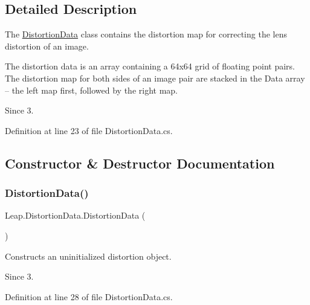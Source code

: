 \subsection{Detailed Description}
The \mbox{\hyperlink{class_leap_1_1_distortion_data}{Distortion\+Data}} class contains the distortion map for correcting the lens distortion of an image. 

The distortion data is an array containing a 64x64 grid of floating point pairs. The distortion map for both sides of an image pair are stacked in the Data array -- the left map first, followed by the right map.

\begin{DoxySince}{Since}
3. 
\end{DoxySince}


Definition at line 23 of file Distortion\+Data.\+cs.



\subsection{Constructor \& Destructor Documentation}
\mbox{\label{class_leap_1_1_distortion_data_a866479e2791b3ff9b3a883a5033afbc2}} 
\subsubsection{\texorpdfstring{DistortionData()}{DistortionData()}\hspace{0.1cm}{\footnotesize\ttfamily [1/2]}}
{\footnotesize\ttfamily Leap.\+Distortion\+Data.\+Distortion\+Data (\begin{DoxyParamCaption}{ }\end{DoxyParamCaption})}



Constructs an uninitialized distortion object. 

\begin{DoxySince}{Since}
3. 
\end{DoxySince}


Definition at line 28 of file Distortion\+Data.\+cs.

\mbox{\label{class_leap_1_1_distortion_data_a7c0d09d78242062014752f7d1ac8823a}} 
